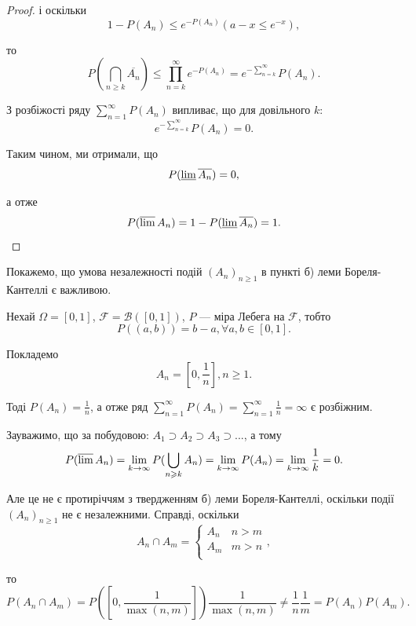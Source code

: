 \begin{proof}
    і оскільки
    $$1 - P(A_n) \leqslant e^{- P(A_n)} (a - x \leqslant e ^{-x}),$$

    то 
    $$P(\bigcap\limits_{n \geqslant k} \overline{A_n})
    \leqslant \prod\limits_{n = k}^{\infty} e^{-P(A_n)}
    = e^{-\sum\limits_{n=k}^{\infty}} P(A_n).$$

    З розбіжості ряду $\sum\limits_{n=1}^{\infty} P(A_n)$ випливає,
    що для довільного $k$:
    $$e^{-\sum\limits_{n=k}^{\infty}} P(A_n) = 0.$$

    Таким чином, ми отримали, що
    $$P(\varliminf \overline{A_n}) = 0,$$

    а отже
    $$P(\varlimsup A_n) = 1 - P(\varliminf \overline{A_n}) = 1.$$
\end{proof}

\begin{example}
    Покажемо, що умова незалежності подій $(A_n)_{n \geqslant 1}$ 
    в пункті б) леми Бореля-Кантеллі є важливою.
    
    Нехай $\Omega = [0, 1]$, $\mathcal{F} = \mathcal{B}([0, 1])$,
    $P$ --- міра Лебега на $\mathcal{F}$, тобто
    $$P((a, b)) = b - a, \forall a, b \in [0, 1].$$
    
    Покладемо
    $$A_n = [0, \frac{1}{n}], n \geqslant 1.$$
    
    Тоді $P(A_n) = \frac{1}{n}$, а отже ряд
    $\sum\limits_{n = 1}^{\infty} P(A_n)
    = \sum\limits_{n = 1}^{\infty} \frac{1}{n}
    = \infty$ є розбіжним.
    
    Зауважимо, що за побудовою: $A_1 \supset A_2 \supset A_3 \supset ...$,
    а тому
    $$P(\varlimsup A_n)
    = \lim\limits_{k \rightarrow \infty} P(\bigcup\limits_{n \geqslant k} A_n)
    = \lim\limits_{k \rightarrow \infty} P(A_n)
    = \lim\limits_{k \rightarrow \infty} \frac{1}{k}
    = 0.$$
    
    Але це не є протиріччям з твердженням б) леми
    Бореля-Кантеллі, оскільки події $(A_n)_{n \geqslant 1}$
    не є незалежними. Справді, оскільки
    $$A_n \cap A_m = \left\{ \begin{array}{ll}
        A_n & n > m \\
        A_m & m > n \\
    \end{array} \right.,$$
    
    то
    $$P(A_n \cap A_m)
    = P([0, \frac{1}{\max(n, m)}])
    \frac{1}{\max(n,m)}
    \neq \frac{1}{n} \frac{1}{m}
    = P(A_n) P(A_m).$$
\end{example}

